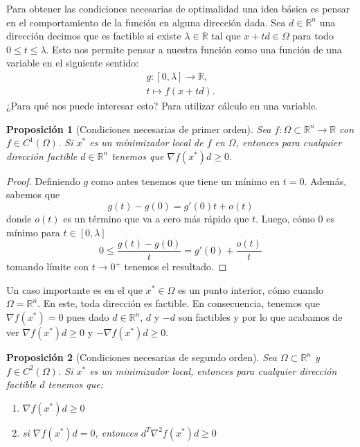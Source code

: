 \documentclass[11pt]{article}
\theoremstyle{ejstyle}
\theoremstyle{ejstyle}
\theoremstyle{ejstyle}
\theoremstyle{ejstyle}
\theoremstyle{ejstyle}
\newtheorem{prop}{Proposición}
\theoremstyle{ejstyle}
\theoremstyle{ejstyle}
\begin{document}
	Para obtener las condiciones necesarias de optimalidad una idea básica es pensar en el comportamiento de la función en alguna dirección dada. Sea $d \in \mathbb{R}^{n}$ una dirección decimos que es factible si existe $\lambda \in \mathbb{R}$ tal que $x + td \in \Omega$ para todo $0 \leq t \leq \lambda$. Esto nos permite pensar a nuestra función como una función de una variable en el siguiente sentido:
	\[
	\begin{aligned}
		g : [0, \lambda] \to \mathbb{R}, \\ 
		t \mapsto f(x + td).		
	\end{aligned}
	\]
	¿Para qué nos puede interesar esto? Para utilizar cálculo en una variable. 
	
	\begin{prop}[Condiciones necesarias de primer orden] 
		Sea $f : \Omega \subset \mathbb{R}^{n} \to \mathbb{R}$ con $f \in C^{1}(\Omega)$. Si $x^{*}$ es un mínimizador local de $f$ en $\Omega$, entonces para cualquier dirección factible $d \in \mathbb{R}^{n}$ tenemos que 
		$\nabla f(x^{*}) d \geq 0.$
	\end{prop}
	
	\begin{proof}
		Definiendo $g$ como antes tenemos que tiene un mínimo en $t=0$. Además, sabemos que
		$$
		g(t) - g(0) = g'(0)t + o(t)
		$$
		donde $o(t)$ es un término que va a cero más rápido que $t$. Luego, cómo 0 es mínimo para $t \in [0, \lambda]$
		$$
		0 \leq \frac{g(t) - g(0)}{t} = g'(0) + \frac{o(t)}{t}
		$$
		tomando límite con $t \to 0^{+}$ tenemos el resultado.
	\end{proof}
	
	Un caso importante es en el que $x^{*} \in \Omega$ es un punto interior, cómo cuando $\Omega = \mathbb{R}^{n}$. En este, toda dirección es factible. En consecuencia, tenemos que $\nabla f(x^{*}) = 0$ pues dado $d \in \mathbb{R}^{n}$, $d$ y $-d$ son factibles y por lo que acabamos de ver $\nabla f(x^{*}) d \geq 0$ y $- \nabla f(x^{*}) d \geq 0$. 
	
	\begin{prop}[Condiciones necesarias de segundo orden]
		Sea $\Omega \subset \mathbb{R}^{n}$ y $f \in C^{2}(\Omega)$. Si $x^{*}$ es un minimizador local, entonces para cualquier dirección factible $d$ tenemos que: 
 		\begin{enumerate}
 			\item $\nabla f(x^{*}) d \geq 0$ 
 			\item si $\nabla f(x^{*})d = 0$, entonces $d^{T} \nabla^{2}f(x^{*}) d \geq 0$
 		\end{enumerate}
	\end{prop}
	
\end{document}
